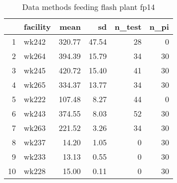 \begin{table}[H]
\centering
\begin{tabular}{rlrrrr}
  \hline
 & facility & mean & sd & n\_test & n\_pi \\ 
  \hline
1 & wk242 & 320.77 & 47.54 &  28 &   0 \\ 
  2 & wk264 & 394.39 & 15.79 &  34 &  30 \\ 
  3 & wk245 & 420.72 & 15.40 &  41 &  30 \\ 
  4 & wk265 & 334.37 & 13.77 &  34 &  30 \\ 
  5 & wk222 & 107.48 & 8.27 &  44 &   0 \\ 
  6 & wk243 & 374.55 & 8.03 &  52 &  30 \\ 
  7 & wk263 & 221.52 & 3.26 &  34 &  30 \\ 
  8 & wk237 & 14.20 & 1.05 &   0 &  30 \\ 
  9 & wk233 & 13.13 & 0.55 &   0 &  30 \\ 
  10 & wk228 & 15.00 & 0.11 &   0 &  30 \\ 
   \hline
\end{tabular}
\caption{Data methods feeding flash plant fp14} 
\label{tab:well_summaries_fp14}
\end{table}
